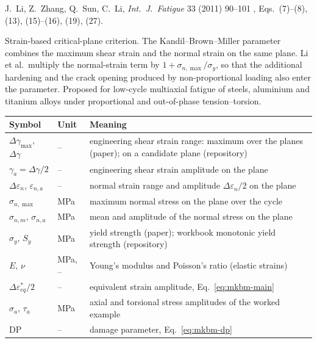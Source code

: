 \label{sheet:MKBM}

 J.~Li, Z.~Zhang, Q.~Sun, C.~Li, \emph{Int.\ J.\ Fatigue} 33 (2011) 90--101
\cite{li2011}, Eqs.~(7)--(8), (13), (15)--(16), (19), (27).

 Strain-based critical-plane criterion. The Kandil--Brown--Miller parameter
combines the maximum shear strain and the normal strain on the same plane. Li et al.\ multiply the
normal-strain term by $1+\sigma_{n,\max}/\sigma_y$, so that the additional hardening and the crack
opening produced by non-proportional loading also enter the parameter. Proposed for low-cycle
multiaxial fatigue of steels, aluminium and titanium alloys under proportional and out-of-phase
tension--torsion.

\begin{center}\small
\begin{tabular}{@{}llp{100mm}@{}}
\toprule
Symbol & Unit & Meaning\\\midrule
$\Delta\gamma_{\max}$, $\Delta\gamma$ & -- & engineering shear strain range: maximum over the planes (paper); on a candidate plane (repository)\\
$\gamma_a=\Delta\gamma/2$ & -- & engineering shear strain amplitude on the plane\\
$\Delta\varepsilon_n$, $\varepsilon_{n,a}$ & -- & normal strain range and amplitude $\Delta\varepsilon_n/2$ on the plane\\
$\sigma_{n,\max}$ & MPa & maximum normal stress on the plane over the cycle\\
$\sigma_{n,m}$, $\sigma_{n,a}$ & MPa & mean and amplitude of the normal stress on the plane\\
$\sigma_y$, $S_y$ & MPa & yield strength (paper); workbook monotonic yield strength (repository)\\
$E$, $\nu$ & MPa, -- & Young's modulus and Poisson's ratio (elastic strains)\\
$\Delta\varepsilon^*_{eq}/2$ & -- & equivalent strain amplitude, Eq.~\eqref{eq:mkbm-main}\\
$\sigma_a$, $\tau_a$ & MPa & axial and torsional stress amplitudes of the worked example\\
$\mathrm{DP}$ & -- & damage parameter, Eq.~\eqref{eq:mkbm-dp}\\
\bottomrule
\end{tabular}
\end{center}

